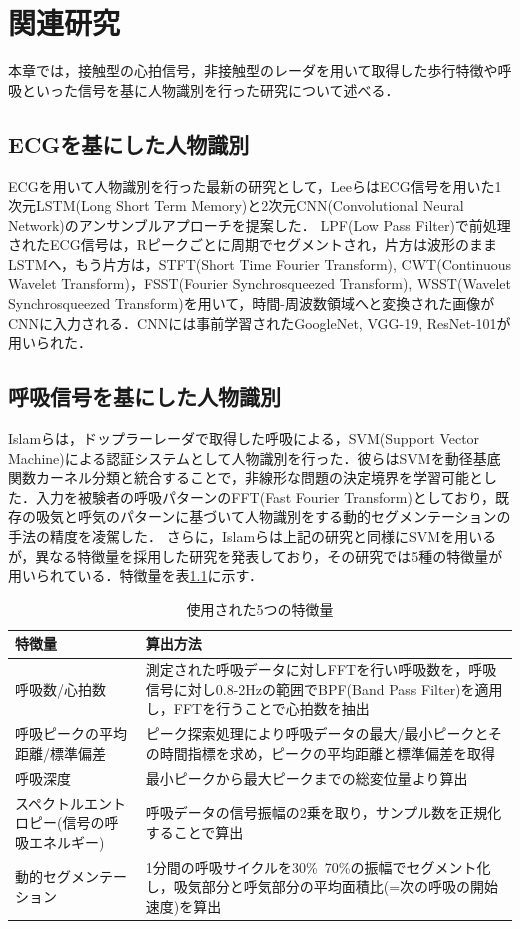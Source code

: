 \chapter{関連研究}
本章では，接触型の心拍信号，非接触型のレーダを用いて取得した歩行特徴や呼吸といった信号を基に人物識別を行った研究について述べる．
\section{ECGを基にした人物識別}
ECGを用いて人物識別を行った最新の研究として，LeeらはECG信号を用いた1次元LSTM(Long Short Term Memory)と2次元CNN(Convolutional Neural Network)のアンサンブルアプローチを提案した\cite{paper:ensemble}．
LPF(Low Pass Filter)で前処理されたECG信号は，Rピークごとに周期でセグメントされ，片方は波形のままLSTMへ，もう片方は，STFT(Short Time Fourier Transform), CWT(Continuous Wavelet Transform)，FSST(Fourier Synchrosqueezed Transform), WSST(Wavelet Synchrosqueezed Transform)を用いて，時間-周波数領域へと変換された画像がCNNに入力される．CNNには事前学習されたGoogleNet, VGG-19, ResNet-101が用いられた．


\section{呼吸信号を基にした人物識別}
Islamらは，ドップラーレーダで取得した呼吸による，SVM(Support Vector Machine)による認証システムとして人物識別を行った\cite{paper:respi_svm}．彼らはSVMを動径基底関数カーネル分類と統合することで，非線形な問題の決定境界を学習可能とした．入力を被験者の呼吸パターンのFFT(Fast Fourier Transform)としており，既存の吸気と呼気のパターンに基づいて人物識別をする動的セグメンテーションの手法\cite{paper:dynamic1}\cite{paper:dynamic2}の精度を凌駕した．
さらに，Islamらは上記の研究と同様にSVMを用いるが，異なる特徴量を採用した研究を発表しており，その研究では5種の特徴量が用いられている．特徴量を表\ref{table:respi}に示す．

\begin{table}[H]
\caption{使用された5つの特徴量}
\centering
\begin{tabular}{|p{3cm}|p{6cm}|}
\hline
特徴量 & 算出方法 \\
\hline
呼吸数/心拍数 & 測定された呼吸データに対しFFTを行い呼吸数を，呼吸信号に対し0.8-2Hzの範囲でBPF(Band Pass Filter)を適用し，FFTを行うことで心拍数を抽出 \\ \hline
呼吸ピークの平均距離/標準偏差 & ピーク探索処理により呼吸データの最大/最小ピークとその時間指標を求め，ピークの平均距離と標準偏差を取得 \\ \hline
呼吸深度 & 最小ピークから最大ピークまでの総変位量より算出 \\ \hline
スペクトルエントロピー(信号の呼吸エネルギー) & 呼吸データの信号振幅の2乗を取り，サンプル数を正規化することで算出 \\ \hline
動的セグメンテーション & 1分間の呼吸サイクルを30\%~70\%の振幅でセグメント化し，吸気部分と呼気部分の平均面積比(=次の呼吸の開始速度)を算出 \\
\hline
\end{tabular}
\label{table:respi}
\end{table}


